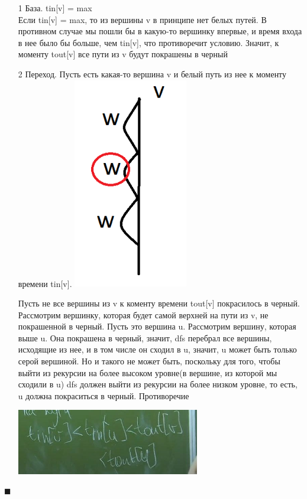 \begin{itemize}
    \item [1] База. tin[v] = max \\ Если tin[v] = max, то из вершины v в принципе нет белых путей. В противном случае мы пошли бы в какую-то вершинку впервые, и время входа в нее было бы больше, чем tin[v], что противоречит условию. Значит, к моменту tout[v] все пути из v будут покрашены в черный
    \item [2] Переход. Пусть есть какая-то вершина v и белый путь из нее к моменту времени tin[v]. 
    \includegraphics[width = 5cm]{images/25-28_фдп8.PNG}
    
    Пусть не все вершины из v к коменту времени tout[v] покрасилось в черный. Рассмотрим вершинку, которая будет самой верхней на пути из v, не покрашенной в черный. Пусть это вершина u. Рассмотрим вершину, которая выше u. Она покрашена в черный, значит, dfs перебрал все вершины, исходящие из нее, и в том числе он сходил в u, значит, u может быть только серой вершиной. Но и такого не может быть, поскольку для того, чтобы выйти из рекурсии на более высоком уровне(в вершине, из которой мы сходили в u) dfs должен выйти из рекурсии на более низком уровне, то есть, u должна покраситься в черный. Противоречие

    \begin{center}
        \includegraphics[width=8cm]{images/25-28_photo_2021-06-19_01-24-53.jpg}
    \end{center}
\end{itemize}
$\blacksquare$

